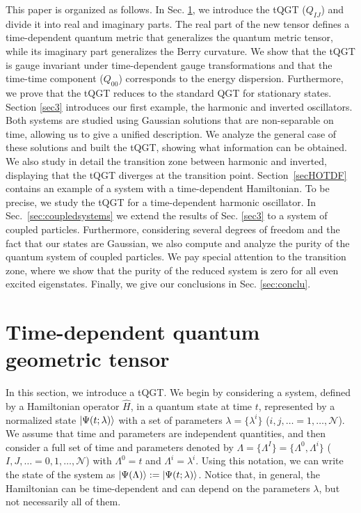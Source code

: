 \documentclass[12pt]{iopart}
\DeclarePairedDelimiter\ket{\lvert}{\rangle}
\begin{document}
This paper is organized as follows. In Sec. \ref{sec2}, we introduce the tQGT ($Q_{IJ}$) and divide it into real and imaginary parts. The real part of the new tensor defines a time-dependent quantum metric that generalizes the quantum metric tensor, while its imaginary part generalizes the Berry curvature. We show that the tQGT is gauge invariant under time-dependent gauge transformations and that the time-time component ($Q_{00}$) corresponds to the energy dispersion. Furthermore, we prove that the tQGT reduces to the standard QGT for stationary states. Section \ref{sec3} introduces our first example, the harmonic and inverted oscillators. Both systems are studied using Gaussian solutions that are non-separable on time, allowing us to give a unified description. We analyze the general case of these solutions and built the tQGT, showing what information can be obtained. We also study in detail the transition zone between harmonic and inverted, displaying that the tQGT diverges at the transition point. Section~\ref{secHOTDF} contains an example of a system with a time-dependent Hamiltonian. To be precise, we study the tQGT for a time-dependent harmonic oscillator.
In Sec.~\ref{sec:coupledsystems} we extend the results of Sec. \ref{sec3} to a system of coupled particles. Furthermore, considering several degrees of freedom and the fact that our states are Gaussian, we also compute and analyze the purity of the quantum system of coupled particles. We pay special attention to the transition zone, where we show that the purity of the reduced system is zero for all even excited eigenstates. Finally, we give our conclusions in Sec. \ref{sec:conclu}.


\section{Time-dependent quantum geometric tensor}\label{sec2}

In this section, we introduce a tQGT. We begin by considering a system, defined by a Hamiltonian operator $\hat{H}$, in a quantum state at time $t$, represented by a normalized state $\ket{\Psi(t;\lambda)}$ with a set of parameters $\lambda=\{\lambda^i\}$ ($i,j,\dots\!=1,\dots,\mathcal{N}$). We assume that time and parameters are independent quantities, and then consider a full set of time and parameters denoted by $\Lambda=\{\Lambda^I\}=\{\Lambda^0,\Lambda^i\}$ ($I,J,\dots\!=0,1,\dots,\mathcal{N}$) with $\Lambda^0=t$ and $\Lambda^i=\lambda^i$. Using this notation, we can write the state of the system as $\ket{\Psi(\Lambda)}:=\ket{\Psi(t;\lambda)}$. Notice that, in general, the Hamiltonian can be time-dependent and can depend on the parameters $\lambda$, but not necessarily all of them.
\end{document}
